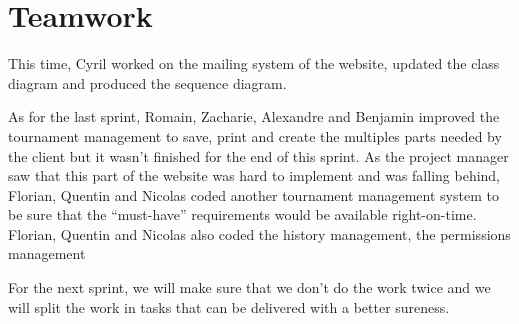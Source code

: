 \section{Teamwork}

This time, Cyril worked on the mailing system of the website, updated the class diagram and produced the sequence diagram. \newline

As for the last sprint, Romain, Zacharie, Alexandre and Benjamin improved the tournament management to save, print and create the multiples parts needed by the client but it wasn't finished for the end of this sprint. As the project manager saw that this part of the website was hard to implement and was falling behind, Florian, Quentin and Nicolas coded another tournament management system to be sure that the \enquote{must-have} requirements would be available right-on-time. Florian, Quentin and Nicolas also coded the history management, the permissions management \newline

For the next sprint, we will make sure that we don't do the work twice and we will split the work in tasks that can be delivered with a better sureness. \newline
